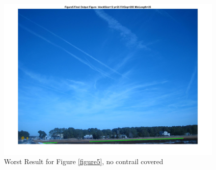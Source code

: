 \begin{figure}[hbtp]
	\centering
	\includegraphics[width=6in]{pic/Figure5_worst.jpg}
	\caption{Worst Result for Figure \ref{figure5}, no contrail covered}
	\label{Figure5_worst}
\end{figure}

